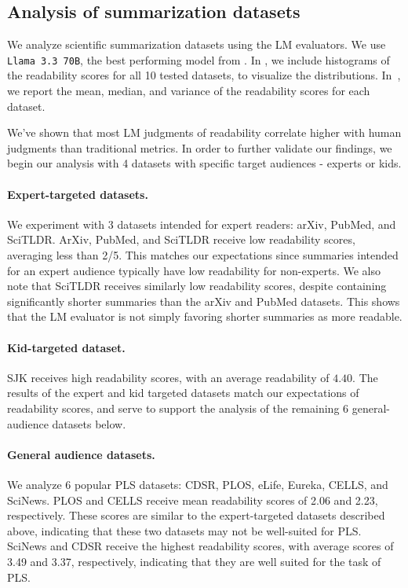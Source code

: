 \subsection[Analysis of summarization datasets]{Analysis of summarization datasets \hyperref[rq4]{\rqfour}}\label{subsec:results-rqfour}
We analyze scientific summarization datasets using the LM evaluators. We use \texttt{Llama 3.3 70B}, the best performing model from . In , we include histograms of the readability scores for all 10 tested datasets, to visualize the distributions. 
In~, we report the mean, median, and variance of the readability scores for each dataset.




We've shown that most LM judgments of readability correlate higher with human judgments than traditional metrics. In order to further validate our findings, we begin our analysis with 4 datasets with specific target audiences - experts or kids. 

\paragraph{Expert-targeted datasets.} We experiment with 3 datasets intended for expert readers: arXiv, PubMed, and SciTLDR. ArXiv, PubMed, and SciTLDR receive low readability scores, averaging less than 2/5. This matches our expectations since summaries intended for an expert audience typically have low readability for non-experts. We also note that SciTLDR receives similarly low readability scores, despite containing significantly shorter summaries than the arXiv and PubMed datasets. This shows that the LM evaluator is not simply favoring shorter summaries as more readable. 

\paragraph{Kid-targeted dataset.} SJK receives high readability scores, with an average readability of $4.40$. The results of the expert and kid targeted datasets match our expectations of readability scores, and serve to support the analysis of the remaining 6 general-audience datasets below.

\paragraph{General audience datasets.} We analyze 6 popular PLS datasets: CDSR, PLOS, eLife, Eureka, CELLS, and SciNews. PLOS and CELLS receive mean readability scores of 2.06 and 2.23, respectively. These scores are similar to the expert-targeted datasets described above, indicating that these two datasets may not be well-suited for PLS. SciNews and CDSR receive the highest readability scores, with average scores of 3.49 and 3.37, respectively, indicating that they are well suited for the task of PLS. 


